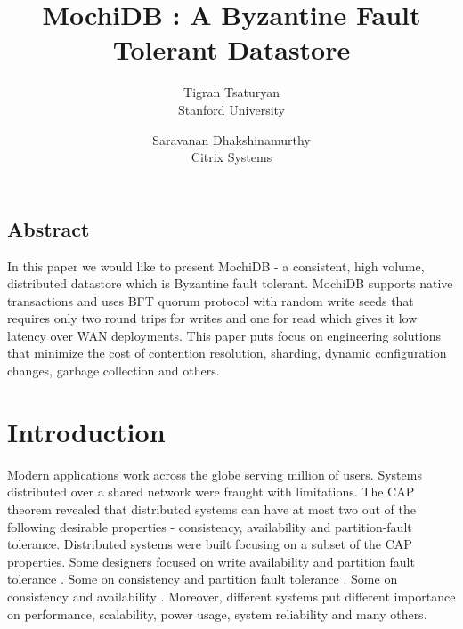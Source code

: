 \documentclass[letterpaper,twocolumn,10pt]{article}
\begin{document}
\date{}

\title{\Large \bf MochiDB : A Byzantine Fault Tolerant Datastore}
\author{
{\rm Tigran Tsaturyan}\\
Stanford University
\and
{\rm Saravanan Dhakshinamurthy}\\
Citrix Systems
}

\maketitle

\thispagestyle{empty}


\subsection*{Abstract}
In this paper we would like to present MochiDB - a consistent, high volume, distributed datastore which is Byzantine fault tolerant. MochiDB supports native transactions and uses BFT quorum protocol with random write seeds that requires only two round trips for writes and one for read which gives it low latency over WAN deployments. This paper puts focus on engineering solutions that minimize the cost of contention resolution, sharding, dynamic configuration changes, garbage collection and others. 

\section{Introduction}

Modern applications work across the globe serving million of users. Systems distributed over a shared network were fraught with limitations. The CAP theorem \cite{CAP_theorem} revealed that distributed systems can have at most two out of the following desirable properties - consistency, availability and partition-fault tolerance. Distributed systems were built focusing on a subset of the CAP properties. Some designers focused on write availability and partition fault tolerance \cite{Dynamo}. Some on consistency and partition fault tolerance \cite{RAFT}. Some on consistency and availability \cite{MYSQL_replication}. Moreover, different systems put different importance on performance, scalability, power usage, system reliability and many others. 
\end{document}
